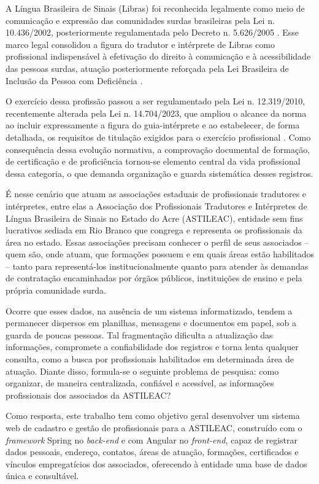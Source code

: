 \documentclass[
        oneside,      %
        english,			
        brazil			 
        ]{abntspiifac}
\begin{document}
A Língua Brasileira de Sinais (Libras) foi reconhecida legalmente como meio de comunicação e expressão das comunidades surdas brasileiras pela Lei n. 10.436/2002, posteriormente regulamentada pelo Decreto n. 5.626/2005 \citep{brasil2002lei10436,brasil2005decreto5626}. Esse marco legal consolidou a figura do tradutor e intérprete de Libras como profissional indispensável à efetivação do direito à comunicação e à acessibilidade das pessoas surdas, atuação posteriormente reforçada pela Lei Brasileira de Inclusão da Pessoa com Deficiência \citep{brasil2015lbi}.

O exercício dessa profissão passou a ser regulamentado pela Lei n. 12.319/2010, recentemente alterada pela Lei n. 14.704/2023, que ampliou o alcance da norma ao incluir expressamente a figura do guia-intérprete e ao estabelecer, de forma detalhada, os requisitos de titulação exigidos para o exercício profissional \citep{brasil2010lei12319,brasil2023lei14704}. Como consequência dessa evolução normativa, a comprovação documental de formação, de certificação e de proficiência tornou-se elemento central da vida profissional dessa categoria, o que demanda organização e guarda sistemática desses registros.

É nesse cenário que atuam as associações estaduais de profissionais tradutores e intérpretes, entre elas a Associação dos Profissionais Tradutores e Intérpretes de Língua Brasileira de Sinais no Estado do Acre (ASTILEAC), entidade sem fins lucrativos sediada em Rio Branco que congrega e representa os profissionais da área no estado. Essas associações precisam conhecer o perfil de seus associados -- quem são, onde atuam, que formações possuem e em quais áreas estão habilitados -- tanto para representá-los institucionalmente quanto para atender às demandas de contratação encaminhadas por órgãos públicos, instituições de ensino e pela própria comunidade surda.

Ocorre que esses dados, na ausência de um sistema informatizado, tendem a permanecer dispersos em planilhas, mensagens e documentos em papel, sob a guarda de poucas pessoas. Tal fragmentação dificulta a atualização das informações, compromete a confiabilidade dos registros e torna lenta qualquer consulta, como a busca por profissionais habilitados em determinada área de atuação. Diante disso, formula-se o seguinte problema de pesquisa: como organizar, de maneira centralizada, confiável e acessível, as informações profissionais dos associados da ASTILEAC?

Como resposta, este trabalho tem como objetivo geral desenvolver um sistema web de cadastro e gestão de profissionais para a ASTILEAC, construído com o \textit{framework} Spring no \textit{back-end} e com Angular no \textit{front-end}, capaz de registrar dados pessoais, endereço, contatos, áreas de atuação, formações, certificados e vínculos empregatícios dos associados, oferecendo à entidade uma base de dados única e consultável.
\end{document}
